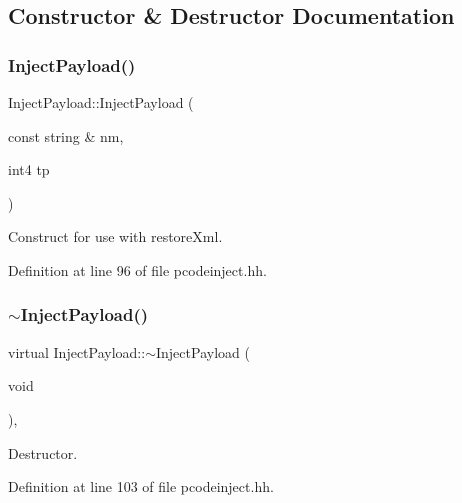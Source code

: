 \subsection{Constructor \& Destructor Documentation}
\mbox{\label{class_inject_payload_a9156655ff65b12ea653d9ef954115022}} 
\subsubsection{\texorpdfstring{InjectPayload()}{InjectPayload()}}
{\footnotesize\ttfamily Inject\+Payload\+::\+Inject\+Payload (\begin{DoxyParamCaption}\item[{const string \&}]{nm,  }\item[{int4}]{tp }\end{DoxyParamCaption})\hspace{0.3cm}{\ttfamily [inline]}}



Construct for use with restore\+Xml. 



Definition at line 96 of file pcodeinject.\+hh.

\mbox{\label{class_inject_payload_a01cbbcc5ac7cb4b1c4e08e9403337745}} 
\subsubsection{\texorpdfstring{$\sim$InjectPayload()}{~InjectPayload()}}
{\footnotesize\ttfamily virtual Inject\+Payload\+::$\sim$\+Inject\+Payload (\begin{DoxyParamCaption}\item[{void}]{ }\end{DoxyParamCaption})\hspace{0.3cm}{\ttfamily [inline]}, {\ttfamily [virtual]}}



Destructor. 



Definition at line 103 of file pcodeinject.\+hh.



